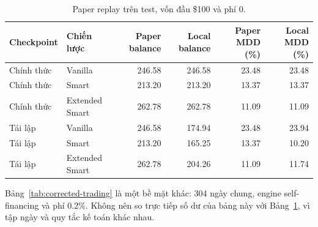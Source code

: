 \documentclass[13pt,a4paper,oneside]{report}
\begin{document}
\begin{table}[htbp]
\centering
\caption{Paper replay trên test, vốn đầu \$100 và phí 0.}
\label{tab:paper-replay}
{\small
\begin{tabularx}{\linewidth}{@{}llrrrr@{}}
\toprule
\textbf{Checkpoint} & \textbf{Chiến lược} & \textbf{Paper balance} & \textbf{Local balance} & \textbf{Paper MDD (\%)} & \textbf{Local MDD (\%)} \\
\midrule
Chính thức & Vanilla & \num{246.58} & \num{246.58} & \num{23.48} & \num{23.48} \\
Chính thức & Smart & \num{213.20} & \num{213.20} & \num{13.37} & \num{13.37} \\
Chính thức & Extended Smart & \num{262.78} & \num{262.78} & \num{11.09} & \num{11.09} \\
\midrule
Tái lập & Vanilla & \num{246.58} & \num{174.94} & \num{23.48} & \num{23.94} \\
Tái lập & Smart & \num{213.20} & \num{165.25} & \num{13.37} & \num{10.20} \\
Tái lập & Extended Smart & \num{262.78} & \num{204.26} & \num{11.09} & \num{11.74} \\
\bottomrule
\end{tabularx}}
\end{table}

Bảng~\ref{tab:corrected-trading} là một bề mặt khác: 304 ngày chung, engine self-financing và phí
0.2\%. Không nên so trực tiếp số dư của bảng này với Bảng~\ref{tab:paper-replay}, vì tập ngày và quy
tắc kế toán khác nhau.
\end{document}
